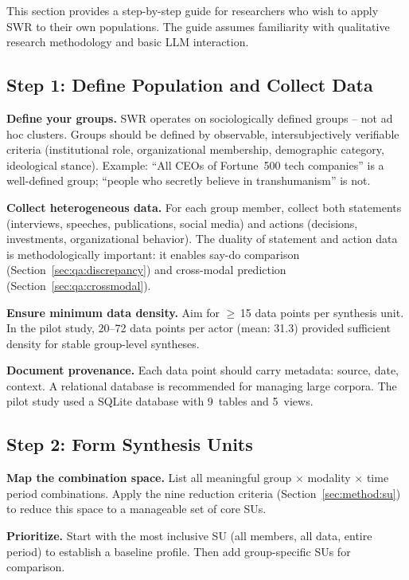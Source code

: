 \documentclass[11pt,a4paper]{article}
\begin{document}
This section provides a step-by-step guide for researchers who wish to apply SWR to their own populations. The guide assumes familiarity with qualitative research methodology and basic LLM interaction.

\subsection{Step 1: Define Population and Collect Data}
\label{sec:app:step1}

\textbf{Define your groups.} SWR operates on sociologically defined groups -- not ad hoc clusters. Groups should be defined by observable, intersubjectively verifiable criteria (institutional role, organizational membership, demographic category, ideological stance). Example: ``All CEOs of Fortune~500 tech companies'' is a well-defined group; ``people who secretly believe in transhumanism'' is not.

\textbf{Collect heterogeneous data.} For each group member, collect both statements (interviews, speeches, publications, social media) and actions (decisions, investments, organizational behavior). The duality of statement and action data is methodologically important: it enables say-do comparison (Section~\ref{sec:qa:discrepancy}) and cross-modal prediction (Section~\ref{sec:qa:crossmodal}).

\textbf{Ensure minimum data density.} Aim for $\geq$\,15 data points per synthesis unit. In the pilot study, 20--72 data points per actor (mean: 31.3) provided sufficient density for stable group-level syntheses.

\textbf{Document provenance.} Each data point should carry metadata: source, date, context. A relational database is recommended for managing large corpora. The pilot study used a SQLite database with 9~tables and 5~views.

\subsection{Step 2: Form Synthesis Units}
\label{sec:app:step2}

\textbf{Map the combination space.} List all meaningful group $\times$ modality $\times$ time period combinations. Apply the nine reduction criteria (Section~\ref{sec:method:su}) to reduce this space to a manageable set of core SUs.

\textbf{Prioritize.} Start with the most inclusive SU (all members, all data, entire period) to establish a baseline profile. Then add group-specific SUs for comparison.
\end{document}
